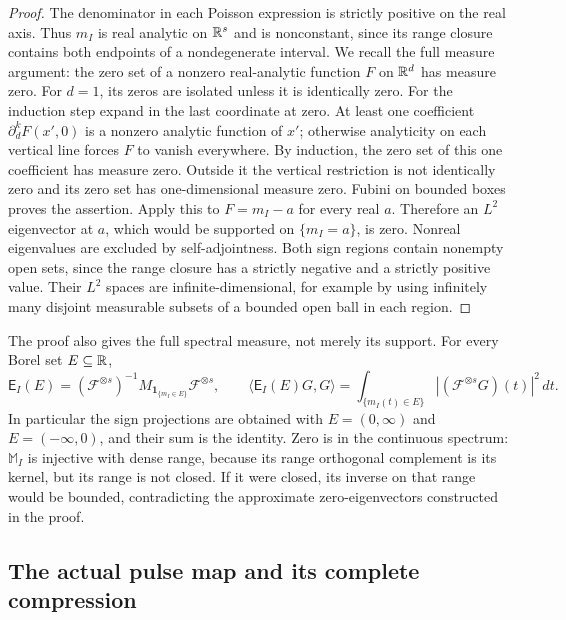 \begin{proof}
The denominator in each Poisson expression is strictly positive
on the real axis. Thus $m_I$ is real analytic on $\mathbb R^s$ and is
nonconstant, since its range closure contains both endpoints of
a nondegenerate interval. We recall the full measure argument:
the zero set of a nonzero real-analytic function $F$ on $\mathbb R^d$
has measure zero. For $d=1$, its zeros are isolated unless it is
identically zero. For the induction step expand in the last
coordinate at zero. At least one coefficient
$\partial_d^kF(x',0)$ is a nonzero analytic function of $x'$;
otherwise analyticity on each vertical line forces $F$ to vanish
everywhere. By induction, the zero set of this one coefficient
has measure zero. Outside it the vertical restriction is not
identically zero and its zero set has one-dimensional measure
zero. Fubini on bounded boxes proves the assertion.
Apply this to $F=m_I-a$ for every real $a$. Therefore an
$L^2$ eigenvector at $a$, which would be supported on
$\{m_I=a\}$, is zero. Nonreal eigenvalues are excluded by
self-adjointness. Both sign regions contain nonempty open sets,
since the range closure has a strictly negative and a strictly
positive value. Their $L^2$ spaces are infinite-dimensional,
for example by using infinitely many disjoint measurable subsets
of a bounded open ball in each region.
\end{proof}

The proof also gives the full spectral measure, not merely its
support. For every Borel set $E\subseteq\mathbb R$,
\begin{equation}\tag{FMS17}\label{fms:fms:projection}
 \mathsf E_I(E)=
 (\mathscr F^{\otimes s})^{-1}
       M_{\mathbf1_{\{m_I\in E\}}}\mathscr F^{\otimes s},\qquad
 \langle\mathsf E_I(E)G,G\rangle
 =\int_{\{m_I(t)\in E\}}
            |(\mathscr F^{\otimes s}G)(t)|^2\,dt.
\end{equation}
In particular the sign projections are obtained with
$E=(0,\infty)$ and $E=(-\infty,0)$, and their sum is the identity.
Zero is in the continuous spectrum: $\mathbb M_I$ is injective
with dense range, because its range orthogonal complement is its
kernel, but its range is not closed. If it were closed, its inverse
on that range would be bounded, contradicting the approximate
zero-eigenvectors constructed in the proof.

\subsection{The actual pulse map and its complete compression}


